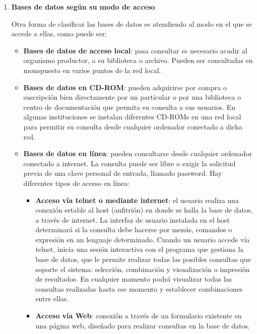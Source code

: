 \begin{enumerate}[label=(\alph*)]
    \newpage

    \item \textbf{Bases de datos según su modo de acceso}

    Otra forma de clasificar las bases de datos es atendiendo al modo en el que se accede a ellas, como puede ser:

    \begin{itemize}
       \item \textbf{Bases de datos de acceso local}: pasa consultar es necesario acudir al organismo productor, a su biblioteca o archivo. Pueden ser consultadas en monopuesto en varios puntos de la red local.

        \item \textbf{Bases de datos en CD-ROM}: pueden adquirirse por compra o suscripción bien directamente por un particular o por una biblioteca o centro de documentación que permita su consulta a sus usuarios. En algunas instituciones se instalan diferentes CD-ROMs en una red local para permitir su consulta desde cualquier ordenador conectado a dicha red.

        \item \textbf{Bases de datos en línea}: pueden consultarse desde cualquier ordenador conectado a internet. La consulta puede ser libre o exigir la solicitud previa de una clave personal de entrada, llamado password. Hay diferentes tipos de acceso en línea:
        \begin{itemize}
            \item \textbf{Acceso vía telnet o mediante internet}: el usuario realiza una conexión estable al host (anfitrión) en donde se halla la base de datos, a través de internet. La interfaz de usuario instalada en el host determinará si la consulta debe hacerse por menús, comandos o expresión en un lenguaje determinado. Cuando un usuario accede vía telnet, inicia una sesión interactiva con el programa que gestiona la base de datos, que le permite realizar todas las posibles consultas que soporte el sistema: selección, combinación y visualización o impresión de resultados. En cualquier momento podrá visualizar todas las consultas realizadas hasta ese momento y establecer combinaciones entre ellas.

            \item \textbf{Acceso vía Web}: conexión a través de un formulario existente en una página web, diseñado para realizar consultas en la base de datos.
        \end{itemize}


\end{itemize}
\end{enumerate}
